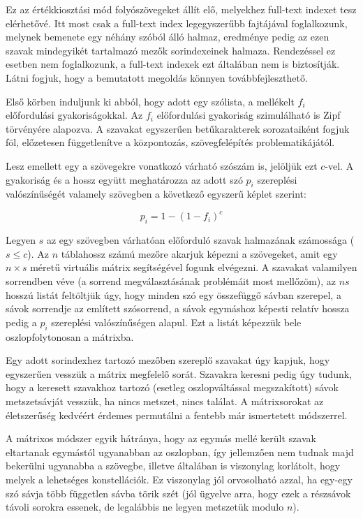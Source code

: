 \documentclass[
    parspace,
    noindent,
    nohyp,
]{elteiktdk}[2023/04/10]
\begin{document}
Ez az értékkiosztási mód folyószövegeket állít elő, melyekhez full-text indexet tesz elérhetővé.
Itt most csak a full-text index legegyszerűbb fajtájával foglalkozunk,
melynek bemenete egy néhány szóból álló halmaz,
eredménye pedig az ezen szavak mindegyikét tartalmazó mezők sorindexeinek halmaza.
Rendezéssel ez esetben nem foglalkozunk, a full-text indexek ezt általában nem is biztosítják.
Látni fogjuk, hogy a bemutatott megoldás könnyen továbbfejleszthető.

Első körben induljunk ki abból, hogy adott egy szólista, a mellékelt $f_i$ előfordulási gyakoriságokkal.
Az $f_i$ előfordulási gyakoriság szimulálható is Zipf törvényére alapozva\cite{Zipf1942UnityOfNature}.
A szavakat egyszerűen betűkarakterek sorozataiként fogjuk föl,
előzetesen függetlenítve a központozás, szövegfelépítés problematikájától.

Lesz emellett egy a szövegekre vonatkozó várható szószám is, jelöljük ezt $c$-vel.
A gyakoriság és a hossz együtt meghatározza az adott szó
$p_i$ szereplési valószínűségét valamely szövegben a következő egyszerű képlet szerint:

$$
p_i = 1 - (1 - f_i)^c
$$

Legyen $s$ az egy szövegben várhatóan előforduló szavak halmazának számossága ($s \leq c$).
Az $n$ táblahossz számú mezőre akarjuk képezni a szövegeket,
amit egy $n \times s$ méretű virtuális mátrix segítségével fogunk elvégezni.
A szavakat valamilyen sorrendben véve (a sorrend megválasztásának problémáit most mellőzöm),
az $n s$ hosszú listát feltöltjük úgy, hogy minden szó egy összefüggő sávban szerepel,
a sávok sorrendje az említett szósorrend,
a sávok egymáshoz képesti relatív hossza pedig a $p_i$ szereplési valószínűségen alapul.
Ezt a listát képezzük bele oszlopfolytonosan a mátrixba.

Egy adott sorindexhez tartozó mezőben szereplő szavakat úgy kapjuk,
hogy egyszerűen vesszük a mátrix megfelelő sorát.
Szavakra keresni pedig úgy tudunk, hogy a keresett szavakhoz tartozó
(esetleg oszlopváltással megszakított) sávok metszetsávját vesszük,
ha nincs metszet, nincs találat.
A mátrixsorokat az életszerűség kedvéért érdemes permutálni a fentebb már ismertetett módszerrel.

A mátrixos módszer egyik hátránya,
hogy az egymás mellé került szavak eltartanak egymástól ugyanabban az oszlopban,
így jellemzően nem tudnak majd bekerülni ugyanabba a szövegbe,
illetve általában is viszonylag korlátolt,
hogy melyek a lehetséges konstellációk.
Ez viszonylag jól orvosolható azzal, ha egy-egy szó sávja több független sávba törik szét
(jól ügyelve arra, hogy ezek a részsávok távoli sorokra essenek,
de legalábbis ne legyen metszetük modulo $n$).
\end{document}
